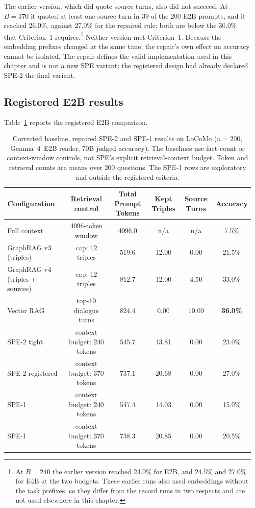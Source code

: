 The earlier version, which did quote source turns, also did not succeed. At $B=370$ it quoted at
least one source turn in 39 of the 200 E2B prompts, and it reached 26.0\%, against 27.0\% for the
repaired rule; both are below the 30.0\% that Criterion~1 requires.\footnote{At $B=240$ the earlier
version reached 24.0\% for E2B, and 24.5\% and 27.0\% for E4B at the two budgets. These earlier runs
also used embeddings without the task prefixes, so they differ from the record runs in two respects
and are not used elsewhere in this chapter.} Neither version met Criterion~1. Because the embedding
prefixes changed at the same time, the repair's own effect on accuracy cannot be isolated. The repair defines the valid implementation used in this chapter and is not a new SPE variant;
the registered design had already declared SPE-2 the final variant.

\subsection{Registered E2B results}
Table~\ref{tab:spe_results} reports the registered E2B comparison.

\begin{table}[htbp]
  \centering
  \scriptsize
  \setlength{\tabcolsep}{3pt}
  \begin{tabular}{lccccc}
    \toprule
    Configuration & Retrieval control & Total Prompt Tokens & Kept Triples & Source Turns & Accuracy \\
    \midrule
    Full context                       & 4096-token window       & 4096.0 & n/a   & n/a   & 7.5\% \\
    GraphRAG v3 (triples)              & cap: 12 triples         & 519.6  & 12.00 & 0.00  & 21.5\% \\
    GraphRAG v4 (triples + sources)    & cap: 12 triples         & 812.7  & 12.00 & 4.50  & 33.0\% \\
    Vector RAG                         & top-10 dialogue turns   & 824.4  & 0.00  & 10.00 & \textbf{36.0\%} \\
    SPE-2 tight                        & context budget: 240 tokens & 545.7  & 13.81 & 0.00  & 23.0\% \\
    SPE-2 registered                   & context budget: 370 tokens & 737.1  & 20.68 & 0.00  & 27.0\% \\
    SPE-1                              & context budget: 240 tokens & 547.4  & 14.03 & 0.00  & 15.0\% \\
    SPE-1                              & context budget: 370 tokens & 738.3  & 20.85 & 0.00  & 20.5\% \\
    \bottomrule
  \end{tabular}
  \caption{Corrected baseline, repaired SPE-2 and SPE-1 results on LoCoMo ($n=200$, Gemma~4~E2B reader,
           70B judged accuracy). The baselines use fact-count or context-window controls, not
           SPE's explicit retrieval-context budget. Token and retrieval counts are means over 200 questions.
           The SPE-1 rows are exploratory and outside the registered criteria.}
  \label{tab:spe_results}
\end{table}

